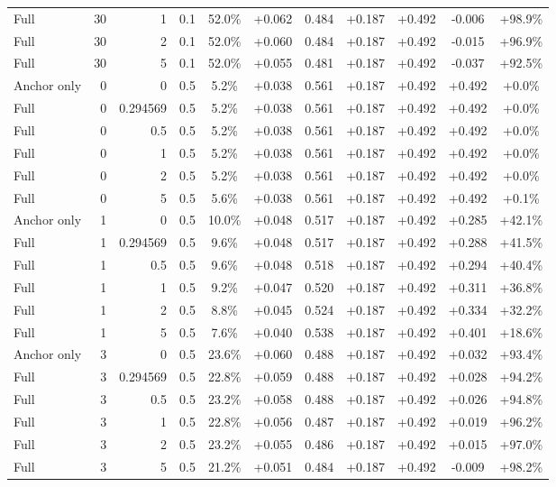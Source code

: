 \begin{table}[htbp]
\begin{tabular}{lrrrccccccc}
Full & 30 & 1 & 0.1 & 52.0\% & +0.062 & 0.484 & +0.187 & +0.492 & -0.006 & +98.9\% \\
Full & 30 & 2 & 0.1 & 52.0\% & +0.060 & 0.484 & +0.187 & +0.492 & -0.015 & +96.9\% \\
Full & 30 & 5 & 0.1 & 52.0\% & +0.055 & 0.481 & +0.187 & +0.492 & -0.037 & +92.5\% \\
Anchor only & 0 & 0 & 0.5 & 5.2\% & +0.038 & 0.561 & +0.187 & +0.492 & +0.492 & +0.0\% \\
Full & 0 & 0.294569 & 0.5 & 5.2\% & +0.038 & 0.561 & +0.187 & +0.492 & +0.492 & +0.0\% \\
Full & 0 & 0.5 & 0.5 & 5.2\% & +0.038 & 0.561 & +0.187 & +0.492 & +0.492 & +0.0\% \\
Full & 0 & 1 & 0.5 & 5.2\% & +0.038 & 0.561 & +0.187 & +0.492 & +0.492 & +0.0\% \\
Full & 0 & 2 & 0.5 & 5.2\% & +0.038 & 0.561 & +0.187 & +0.492 & +0.492 & +0.0\% \\
Full & 0 & 5 & 0.5 & 5.6\% & +0.038 & 0.561 & +0.187 & +0.492 & +0.492 & +0.1\% \\
Anchor only & 1 & 0 & 0.5 & 10.0\% & +0.048 & 0.517 & +0.187 & +0.492 & +0.285 & +42.1\% \\
Full & 1 & 0.294569 & 0.5 & 9.6\% & +0.048 & 0.517 & +0.187 & +0.492 & +0.288 & +41.5\% \\
Full & 1 & 0.5 & 0.5 & 9.6\% & +0.048 & 0.518 & +0.187 & +0.492 & +0.294 & +40.4\% \\
Full & 1 & 1 & 0.5 & 9.2\% & +0.047 & 0.520 & +0.187 & +0.492 & +0.311 & +36.8\% \\
Full & 1 & 2 & 0.5 & 8.8\% & +0.045 & 0.524 & +0.187 & +0.492 & +0.334 & +32.2\% \\
Full & 1 & 5 & 0.5 & 7.6\% & +0.040 & 0.538 & +0.187 & +0.492 & +0.401 & +18.6\% \\
Anchor only & 3 & 0 & 0.5 & 23.6\% & +0.060 & 0.488 & +0.187 & +0.492 & +0.032 & +93.4\% \\
Full & 3 & 0.294569 & 0.5 & 22.8\% & +0.059 & 0.488 & +0.187 & +0.492 & +0.028 & +94.2\% \\
Full & 3 & 0.5 & 0.5 & 23.2\% & +0.058 & 0.488 & +0.187 & +0.492 & +0.026 & +94.8\% \\
Full & 3 & 1 & 0.5 & 22.8\% & +0.056 & 0.487 & +0.187 & +0.492 & +0.019 & +96.2\% \\
Full & 3 & 2 & 0.5 & 23.2\% & +0.055 & 0.486 & +0.187 & +0.492 & +0.015 & +97.0\% \\
Full & 3 & 5 & 0.5 & 21.2\% & +0.051 & 0.484 & +0.187 & +0.492 & -0.009 & +98.2\% \\

\end{tabular}
\end{table}
